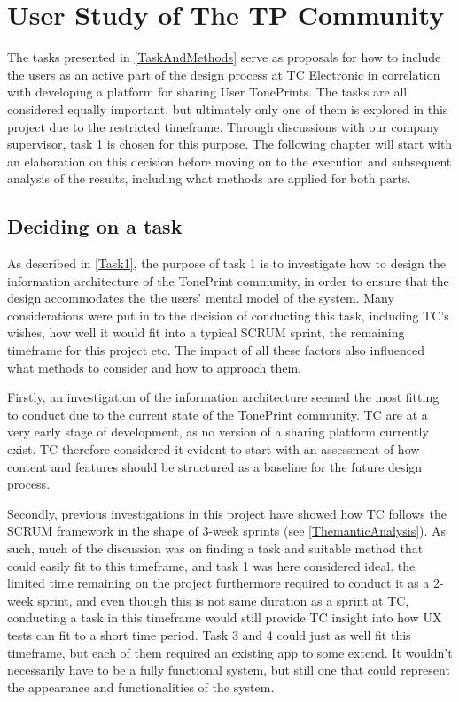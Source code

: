 \chapter{User Study of The TP Community}
\label{ChapterWorkshop}
The tasks presented in \autoref{TaskAndMethods} serve as proposals for how to include the users as an active part of the design process at TC Electronic in correlation with developing a platform for sharing User TonePrints. The tasks are all considered equally important, but ultimately only one of them is explored in this project due to the restricted timeframe. Through discussions with our company supervisor, task 1 is chosen for this purpose. The following chapter will start with an elaboration on this decision before moving on to the execution and subsequent analysis of the results, including what methods are applied for both parts.

\section{Deciding on a task}
\label{TaskDecision}
As described in \autoref{Task1}, the purpose of task 1 is to investigate how to design the information architecture of the TonePrint community, in order to ensure that the design accommodates the the users' mental model of the system. Many considerations were put in to the decision of conducting this task, including TC's wishes, how well it would fit into a typical SCRUM sprint, the remaining timeframe for this project etc. The impact of all these factors also influenced what methods to consider and how to approach them.

Firstly, an investigation of the information architecture seemed the most fitting to conduct due to the current state of the TonePrint community. TC are at a very early stage of development, as no version of a sharing platform currently exist. TC therefore considered it evident to start with an assessment of how content and features should be structured as a baseline for the future design process.

Secondly, previous investigations in this project have showed how TC follows the SCRUM framework in the shape of 3-week sprints (see \autoref{ThemanticAnalysis}). As such, much of the discussion was on finding a task and suitable method that could easily fit to this timeframe, and task 1 was here considered ideal. the limited time remaining on the project furthermore required to conduct it as a 2-week sprint, and even though this is not same duration as a sprint at TC, conducting a task in this timeframe would still provide TC insight into how UX tests can fit to a short time period. Task 3 and 4 could just as well fit this timeframe, but each of them required an existing app to some extend. It wouldn't necessarily have to be a fully functional system, but still one that could represent the appearance and functionalities of the system.

